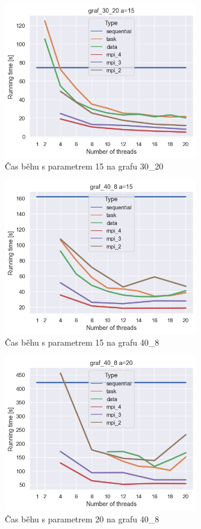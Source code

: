 \documentclass[epsf,epic,eepic,eepicemu]{article}\oddsidemargin=-5mm
\begin{document}
\begin{figure}
\centering
\includegraphics[width=0.75\textwidth]{images/runtime_15__30_20}
\caption{Čas běhu s parametrem 15 na grafu 30\_20}
\label{fig:runtime_15__30_20}
\end{figure}
\begin{figure}
\centering
\includegraphics[width=0.75\textwidth]{images/runtime_15__40_8}
\caption{Čas běhu s parametrem 15 na grafu 40\_8}
\label{fig:runtime_15__40_8}
\end{figure}
\begin{figure}
\centering
\includegraphics[width=0.75\textwidth]{images/runtime_20__40_8}
\caption{Čas běhu s parametrem 20 na grafu 40\_8}
\label{fig:runtime_20__40_8}
\end{figure}
\end{document}
